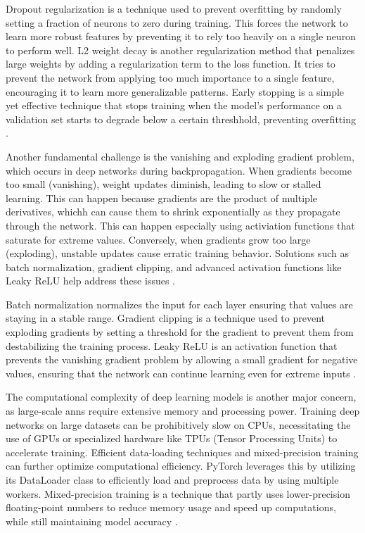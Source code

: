 Dropout regularization is a technique used to prevent overfitting by randomly setting a fraction of neurons to zero during training.
This forces the network to learn more robust features by preventing it to rely too heavily on a single neuron to perform well.
L2 weight decay is another regularization method that penalizes large weights by adding a regularization term to the loss function.
It tries to prevent the network from applying too much importance to a single feature, encouraging it to learn more generalizable patterns.
Early stopping is a simple yet effective technique that stops training when the model's performance on a validation set starts to degrade below a certain threshhold, preventing overfitting \cite{pytorchPyTorch,glorot2010understanding}.

Another fundamental challenge is the vanishing and exploding gradient problem, which occurs in deep networks during backpropagation.
When gradients become too small (vanishing), weight updates diminish, leading to slow or stalled learning.
This can happen because gradients are the product of multiple derivatives, whichh can cause them to shrink exponentially as they propagate through the network.
This can happen especially using activiation functions that saturate for extreme values.
Conversely, when gradients grow too large (exploding), unstable updates cause erratic training behavior.
Solutions such as batch normalization, gradient clipping, and advanced activation functions like Leaky ReLU help address these issues \cite{pytorchPyTorch,glorot2010understanding}.

Batch normalization normalizes the input for each layer ensuring that values are staying in a stable range.
Gradient clipping is a technique used to prevent exploding gradients by setting a threshold for the gradient to prevent them from destabilizing the training process.
Leaky ReLU is an activation function that prevents the vanishing gradient problem by allowing a small gradient for negative values, ensuring that the network can continue learning even for extreme inputs \cite{pytorchPyTorch,glorot2010understanding}.

The computational complexity of deep learning models is another major concern, as large-scale \ac{ann}s require extensive memory and processing power.
Training deep networks on large datasets can be prohibitively slow on CPUs, necessitating the use of GPUs or specialized hardware like TPUs (Tensor Processing Units) to accelerate training.
Efficient data-loading techniques and mixed-precision training can further optimize computational efficiency.
PyTorch leverages this by utilizing its DataLoader class to efficiently load and preprocess data by using multiple workers.
Mixed-precision training is a technique that partly uses lower-precision floating-point numbers to reduce memory usage and speed up computations, while still maintaining model accuracy \cite{pytorchPyTorch}.

